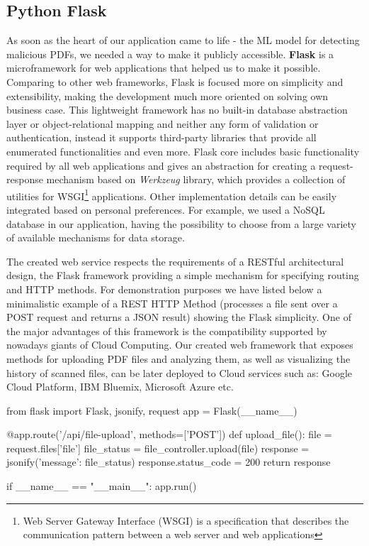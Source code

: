 \subsection{Python Flask}
As soon as the heart of our application came to life - the ML model for detecting malicious PDFs, we needed a way to make it publicly accessible. \textbf{Flask} is a microframework for web applications that helped us to make it possible. Comparing to other web frameworks, Flask is focused more on simplicity and extensibility, making the development much more oriented on solving own business case. This lightweight framework has no built-in database abstraction layer or object-relational mapping and neither any form of validation or authentication, instead it supports third-party libraries that provide all enumerated functionalities and even more. Flask core includes basic functionality required by all web applications and gives an abstraction for creating a request-response mechanism based on \textit{Werkzeug} library, which provides a collection of utilities for WSGI\footnote{Web Server Gateway Interface (WSGI) is a specification that describes the communication pattern between a web server and web applications} applications. Other implementation details can be easily integrated based on personal preferences. For example, we used a NoSQL database in our application, having the possibility to choose from a large variety of available mechanisms for data storage. \par
The created web service respects the requirements of a RESTful architectural design, the Flask framework providing a simple mechanism for specifying routing and HTTP methods. For demonstration purposes we have listed below a minimalistic example of a REST HTTP Method (processes a file sent over a POST request and returns a JSON result) showing the Flask simplicity. One of the major advantages of this framework is the compatibility supported by nowadays giants of Cloud Computing. Our created web framework that exposes methods for uploading PDF files and analyzing them, as well as visualizing the history of scanned files, can be later deployed to Cloud services such as: Google Cloud Platform, IBM Bluemix, Microsoft Azure etc. 

\newpage

\begin{python}
from flask import Flask, jsonify, request
app = Flask(__name__)

@app.route('/api/file-upload', methods=['POST'])
def upload_file():
	file = request.files['file']
	file_status = file_controller.upload(file)
	response = jsonify({'message': file_status})
	response.status_code = 200
	return response

if __name__ == "__main__":
    app.run()
\end{python}



